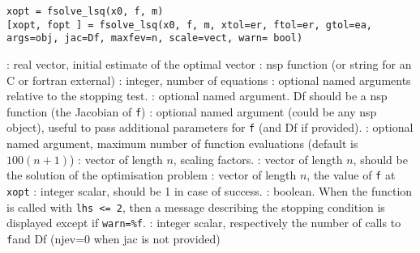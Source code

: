 
\begin{mandesc}
\end{mandesc}

\begin{calling_sequence}
\begin{verbatim}
xopt = fsolve_lsq(x0, f, m)
[xopt, fopt ] = fsolve_lsq(x0, f, m, xtol=er, ftol=er, gtol=ea, args=obj, jac=Df, maxfev=n, scale=vect, warn= bool) 
\end{verbatim}
\end{calling_sequence}
\begin{parameters}
  \begin{varlist}
    : real vector, initial estimate of the optimal vector
    : nsp function (or string for an C or fortran external)
    : integer, number of equations
    : optional named arguments relative to the stopping test.
    : optional named argument. Df should be a nsp function (the Jacobian of \verb+f+)
    : optional named argument (could be any nsp object), useful to pass additional parameters for \verb+f+ (and
    Df if provided).
    : optional named argument, maximum number of function evaluations (default is $100(n+1)$)
    : vector of length $n$, scaling factors.
    : vector of length $n$, should be the solution of the optimisation problem 
    : vector of length $n$, the value of \verb+f+  at \verb+xopt+
    : integer scalar, should be 1 in case of success.
    : boolean. When the function is called with \verb+lhs <= 2+, then a message describing the 
    stopping condition is displayed except if \verb+warn=%f+.
    : integer scalar, respectively the number of calls to \verb+f+and Df (njev=0 when jac is not provided)
  \end{varlist}
\end{parameters}


